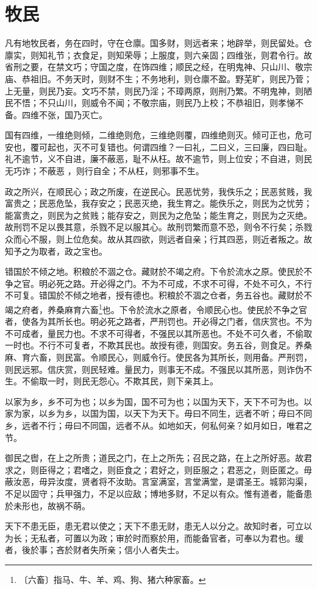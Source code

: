 \documentclass[12pt,UTF-8,openany]{ctexbook}
\begin{document}
\chapter{牧民}

\begin{normalsize}
    
    凡有地牧民者，务在四时，守在仓廪。国多财，则远者来；地辟举，则民留处。仓廪实，则知礼节；衣食足，则知荣辱；上服度，则六亲固；四维张，则君令行。故省刑之要，在禁文巧；守国之度，在饰四维；顺民之经，在明鬼神、只山川、敬宗庙、恭祖旧。不务天时，则财不生；不务地利，则仓廪不盈。野芜旷，则民乃菅；上无量，则民乃妄。文巧不禁，则民乃淫；不璋两原，则刑乃繁。不明鬼神，则陋民不悟；不只山川，则威令不闻；不敬宗庙，则民乃上校；不恭祖旧，则孝悌不备。四维不张，国乃灭亡。
    
    国有四维，一维绝则倾，二维绝则危，三维绝则覆，四维绝则灭。倾可正也，危可安也，覆可起也，灭不可复错也。何谓四维？一曰礼，二曰义，三曰廉，四曰耻。礼不逾节，义不自进，廉不蔽恶，耻不从枉。故不逾节，则上位安；不自进，则民无巧诈；不蔽恶 ，则行自全；不从枉，则邪事不生。
    
    政之所兴，在顺民心；政之所废，在逆民心。民恶忧劳，我佚乐之；民恶贫贱，我富贵之；民恶危坠，我存安之；民恶灭绝，我生育之。能佚乐之，则民为之忧劳；能富贵之，则民为之贫贱；能存安之，则民为之危坠；能生育之，则民为之灭绝。故刑罚不足以畏其意，杀戮不足以服其心。故刑罚繁而意不恐，则令不行矣；杀戮众而心不服，则上位危矣。故从其四欲，则远者自亲；行其四恶，则近者叛之。故知予之为取者，政之宝也。
    
    错国於不倾之地。积粮於不涸之仓。藏财於不竭之府。下令於流水之原。使民於不争之官。明必死之路。开必得之门。不为不可成，不求不可得，不处不可久，不行不可复。错国於不倾之地者，授有德也。积粮於不涸之仓者，务五谷也。藏财於不竭之府者，养桑麻育六畜\footnote{〔六畜〕指马、牛、羊、鸡、狗、猪六种家畜。}也。下令於流水之原者，令顺民心也。使民於不争之官者，使各为其所长也。明必死之路者，严刑罚也。开必得之门者，信庆赏也。不为不可成者，量民力也。不求不可得者，不强民以其所恶也。不处不可久者，不偷取一时也。不行不可复者，不欺其民也。故授有德，则国安。务五谷，则食足。养桑麻、育六畜，则民富。令顺民心，则威令行。使民各为其所长，则用备。严刑罚，则民远邪。信庆赏，则民轻难。量民力，则事无不成。不强民以其所恶，则诈伪不生。不偷取一时，则民无怨心。不欺其民，则下亲其上。
    
    以家为乡，乡不可为也；以乡为国，国不可为也；以国为天下，天下不可为也。以家为家，以乡为乡，以国为国，以天下为天下。毋曰不同生，远者不听；毋曰不同乡，远者不行；毋曰不同国，远者不从。如地如天，何私何亲？如月如日，唯君之节。
    
    御民之辔，在上之所贵；道民之门，在上之所先；召民之路，在上之所好恶。故君求之，则臣得之；君嗜之，则臣食之；君好之，则臣服之；君恶之，则臣匿之。毋蔽汝恶，毋异汝度，贤者将不汝助。言室满室，言堂满堂，是谓圣王。城郭沟渠，不足以固守；兵甲强力，不足以应敌；博地多财，不足以有众。惟有道者，能备患於未形也，故祸不萌。
    
    天下不患无臣，患无君以使之；天下不患无财，患无人以分之。故知时者，可立以为长；无私者，可置以为政；审於时而察於用，而能备官者，可奉以为君也。缓者，後於事；吝於财者失所亲；信小人者失士。
\end{normalsize}
\end{document}
